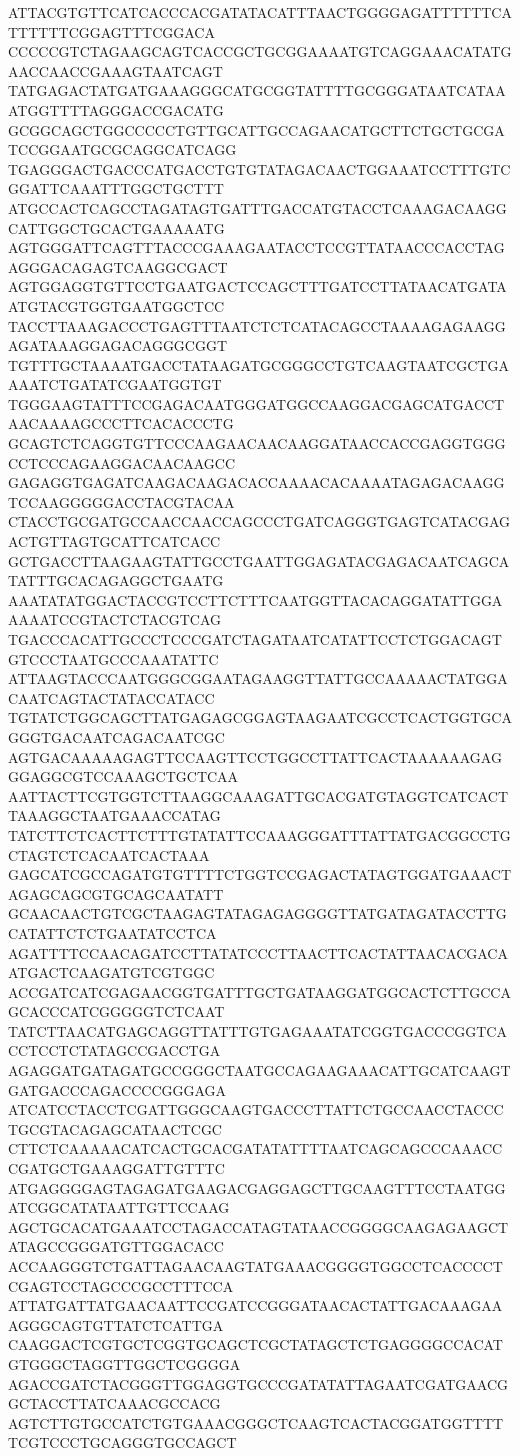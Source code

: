 ATTACGTGTTCATCACCCACGATATACATTTAACTGGGGAGATTTTTTCATTTTTTCGGAGTTTCGGACA
CCCCCGTCTAGAAGCAGTCACCGCTGCGGAAAATGTCAGGAAACATATGAACCAACCGAAAGTAATCAGT
TATGAGACTATGATGAAAGGGCATGCGGTATTTTGCGGGATAATCATAAATGGTTTTAGGGACCGACATG
GCGGCAGCTGGCCCCCTGTTGCATTGCCAGAACATGCTTCTGCTGCGATCCGGAATGCGCAGGCATCAGG
TGAGGGACTGACCCATGACCTGTGTATAGACAACTGGAAATCCTTTGTCGGATTCAAATTTGGCTGCTTT
ATGCCACTCAGCCTAGATAGTGATTTGACCATGTACCTCAAAGACAAGGCATTGGCTGCACTGAAAAATG
AGTGGGATTCAGTTTACCCGAAAGAATACCTCCGTTATAACCCACCTAGAGGGACAGAGTCAAGGCGACT
AGTGGAGGTGTTCCTGAATGACTCCAGCTTTGATCCTTATAACATGATAATGTACGTGGTGAATGGCTCC
TACCTTAAAGACCCTGAGTTTAATCTCTCATACAGCCTAAAAGAGAAGGAGATAAAGGAGACAGGGCGGT
TGTTTGCTAAAATGACCTATAAGATGCGGGCCTGTCAAGTAATCGCTGAAAATCTGATATCGAATGGTGT
TGGGAAGTATTTCCGAGACAATGGGATGGCCAAGGACGAGCATGACCTAACAAAAGCCCTTCACACCCTG
GCAGTCTCAGGTGTTCCCAAGAACAACAAGGATAACCACCGAGGTGGGCCTCCCAGAAGGACAACAAGCC
GAGAGGTGAGATCAAGACAAGACACCAAAACACAAAATAGAGACAAGGTCCAAGGGGGACCTACGTACAA
CTACCTGCGATGCCAACCAACCAGCCCTGATCAGGGTGAGTCATACGAGACTGTTAGTGCATTCATCACC
GCTGACCTTAAGAAGTATTGCCTGAATTGGAGATACGAGACAATCAGCATATTTGCACAGAGGCTGAATG
AAATATATGGACTACCGTCCTTCTTTCAATGGTTACACAGGATATTGGAAAAATCCGTACTCTACGTCAG
TGACCCACATTGCCCTCCCGATCTAGATAATCATATTCCTCTGGACAGTGTCCCTAATGCCCAAATATTC
ATTAAGTACCCAATGGGCGGAATAGAAGGTTATTGCCAAAAACTATGGACAATCAGTACTATACCATACC
TGTATCTGGCAGCTTATGAGAGCGGAGTAAGAATCGCCTCACTGGTGCAGGGTGACAATCAGACAATCGC
AGTGACAAAAAGAGTTCCAAGTTCCTGGCCTTATTCACTAAAAAAGAGGGAGGCGTCCAAAGCTGCTCAA
AATTACTTCGTGGTCTTAAGGCAAAGATTGCACGATGTAGGTCATCACTTAAAGGCTAATGAAACCATAG
TATCTTCTCACTTCTTTGTATATTCCAAAGGGATTTATTATGACGGCCTGCTAGTCTCACAATCACTAAA
GAGCATCGCCAGATGTGTTTTCTGGTCCGAGACTATAGTGGATGAAACTAGAGCAGCGTGCAGCAATATT
GCAACAACTGTCGCTAAGAGTATAGAGAGGGGTTATGATAGATACCTTGCATATTCTCTGAATATCCTCA
AGATTTTCCAACAGATCCTTATATCCCTTAACTTCACTATTAACACGACAATGACTCAAGATGTCGTGGC
ACCGATCATCGAGAACGGTGATTTGCTGATAAGGATGGCACTCTTGCCAGCACCCATCGGGGGTCTCAAT
TATCTTAACATGAGCAGGTTATTTGTGAGAAATATCGGTGACCCGGTCACCTCCTCTATAGCCGACCTGA
AGAGGATGATAGATGCCGGGCTAATGCCAGAAGAAACATTGCATCAAGTGATGACCCAGACCCCGGGAGA
ATCATCCTACCTCGATTGGGCAAGTGACCCTTATTCTGCCAACCTACCCTGCGTACAGAGCATAACTCGC
CTTCTCAAAAACATCACTGCACGATATATTTTAATCAGCAGCCCAAACCCGATGCTGAAAGGATTGTTTC
ATGAGGGGAGTAGAGATGAAGACGAGGAGCTTGCAAGTTTCCTAATGGATCGGCATATAATTGTTCCAAG
AGCTGCACATGAAATCCTAGACCATAGTATAACCGGGGCAAGAGAAGCTATAGCCGGGATGTTGGACACC
ACCAAGGGTCTGATTAGAACAAGTATGAAACGGGGTGGCCTCACCCCTCGAGTCCTAGCCCGCCTTTCCA
ATTATGATTATGAACAATTCCGATCCGGGATAACACTATTGACAAAGAAAGGGCAGTGTTATCTCATTGA
CAAGGACTCGTGCTCGGTGCAGCTCGCTATAGCTCTGAGGGGCCACATGTGGGCTAGGTTGGCTCGGGGA
AGACCGATCTACGGGTTGGAGGTGCCCGATATATTAGAATCGATGAACGGCTACCTTATCAAACGCCACG
AGTCTTGTGCCATCTGTGAAACGGGCTCAAGTCACTACGGATGGTTTTTCGTCCCTGCAGGGTGCCAGCT
